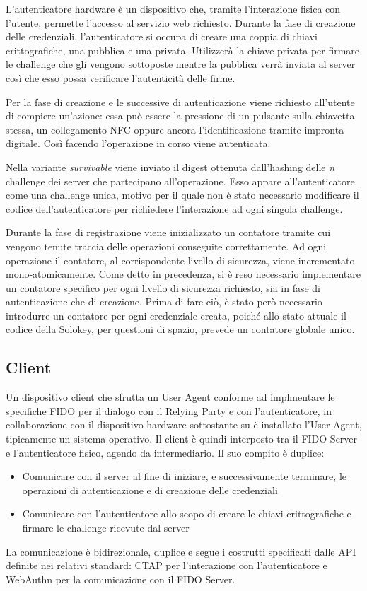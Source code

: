 L'autenticatore hardware è un dispositivo che, tramite l'interazione fisica con l'utente, permette l'accesso al servizio web richiesto. Durante la fase di creazione delle credenziali, l'autenticatore si occupa di creare una coppia di chiavi crittografiche, una pubblica e una privata. Utilizzerà la chiave privata per firmare le challenge che gli vengono sottoposte mentre la pubblica verrà inviata al server così che esso possa verificare l'autenticità delle firme.

Per la fase di creazione e le successive di autenticazione viene richiesto all'utente di compiere un'azione: essa può essere la pressione di un pulsante sulla chiavetta stessa, un collegamento NFC oppure ancora l'identificazione tramite impronta digitale. Così facendo l'operazione in corso viene autenticata.

Nella variante \emph{survivable} viene inviato il digest ottenuta dall'hashing delle \emph{n} challenge dei server che partecipano all'operazione. Esso appare all'autenticatore come una challenge unica, motivo per il quale non è stato necessario modificare il codice dell'autenticatore per richiedere l'interazione ad ogni singola challenge. 

Durante la fase di registrazione viene inizializzato un contatore tramite cui vengono tenute traccia delle operazioni conseguite correttamente. Ad ogni operazione il contatore, al corrispondente livello di sicurezza, viene incrementato mono-atomicamente. Come detto in precedenza, si è reso necessario implementare un contatore specifico per ogni livello di sicurezza richiesto, sia in fase di autenticazione che di creazione. Prima di fare ciò, è stato però necessario introdurre un contatore per ogni credenziale creata, poiché allo stato attuale il codice della Solokey, per questioni di spazio, prevede un contatore globale unico. 

\subsection{Client}
\label{client}

Un dispositivo client che sfrutta un User Agent conforme ad implmentare le specifiche FIDO per il dialogo con il Relying Party e con l'autenticatore, in collaborazione con il dispositivo hardware sottostante su è installato l'User Agent, tipicamente un sistema operativo. Il client è quindi interposto tra il FIDO Server e l'autenticatore fisico, agendo da intermediario. Il suo compito è duplice:
\begin{itemize}
	\item Comunicare con il server al fine di iniziare, e successivamente terminare, le operazioni di autenticazione e di creazione delle credenziali 
	\item Comunicare con l'autenticatore allo scopo di creare le chiavi crittografiche e firmare le challenge ricevute dal server
\end{itemize}
La comunicazione è bidirezionale, duplice e segue i costrutti specificati dalle API definite nei relativi standard: CTAP per l'interazione con l'autenticatore e WebAuthn per la comunicazione con il FIDO Server. 


